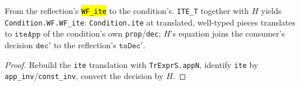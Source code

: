 \begin{theorem}
  \label{prim-cond:thm:condition-reflect-ite}
  \leanok

   From the reflection's \hl{\texttt{WF\_ite}} to the condition's.
  \texttt{ITE\_T} together with $H$ yields \texttt{Condition.WF.WF\_ite}: \texttt{Condition.ite} at
  translated, well-typed pieces translates to $\mathtt{iteApp}$ of the condition's own
  \texttt{prop}/\texttt{dec}; $H$'s equation joins the consumer's decision $\mathtt{dec}'$ to the
  reflection's $\mathtt{toDec}'$.
\end{theorem}
\begin{proof}
  \leanok
   Rebuild the \texttt{ite} translation with \texttt{TrExprS.appN}, identify \texttt{ite}
  by \texttt{app\_inv}/\texttt{const\_inv}, convert the decision by $H$.
\end{proof}

